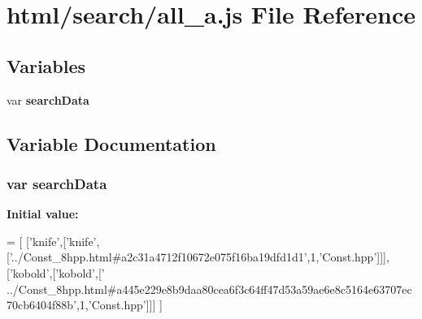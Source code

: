 \section{html/search/all\-\_\-a.js File Reference}
\label{all__a_8js}
\subsection*{Variables}
\begin{DoxyCompactItemize}
\item 
var {\bf search\-Data}
\end{DoxyCompactItemize}


\subsection{Variable Documentation}
\subsubsection[{search\-Data}]{\setlength{\rightskip}{0pt plus 5cm}var search\-Data}\label{all__a_8js_ad01a7523f103d6242ef9b0451861231e}
{\bfseries Initial value\-:}
\begin{DoxyCode}
=
[
  [\textcolor{stringliteral}{'knife'},[\textcolor{stringliteral}{'knife'},[\textcolor{stringliteral}{'../Const\_8hpp.html#a2c31a4712f10672e075f16ba19dfd1d1'},1,\textcolor{stringliteral}{'Const.hpp'}]]],
  [\textcolor{stringliteral}{'kobold'},[\textcolor{stringliteral}{'kobold'},[\textcolor{stringliteral}{'
      ../Const\_8hpp.html#a445e229e8b9daa80cea6f3c64ff47d53a59ae6e8c5164e63707ec70cb6404f88b'},1,\textcolor{stringliteral}{'Const.hpp'}]]]
]
\end{DoxyCode}
